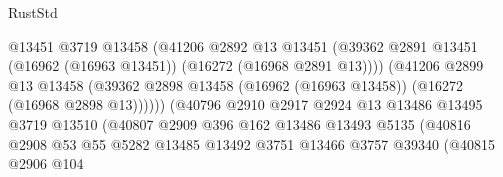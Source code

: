 \begin{lexlean}{RustStd}
\begin{coremodule}
                                          @13451
                                          @3719
                                          @13458
                                          (@41206
                                            @2892
                                            @13
                                            @13451
                                            (@39362
                                              @2891
                                              @13451
                                              (@16962 (@16963 @13451))
                                              (@16272 (@16968 @2891 @13))))
                                          (@41206
                                            @2899
                                            @13
                                            @13458
                                            (@39362
                                              @2898
                                              @13458
                                              (@16962 (@16963 @13458))
                                              (@16272 (@16968 @2898 @13))))))
                                      (@40796
                                        @2910
                                        @2917
                                        @2924
                                        @13
                                        @13486
                                        @13495
                                        @3719
                                        @13510
                                        (@40807
                                          @2909
                                          @396
                                          @162
                                          @13486
                                          @13493
                                          @5135
                                          (@40816
                                            @2908
                                            @53
                                            @55
                                            @5282
                                            @13485
                                            @13492
                                            @3751
                                            @13466
                                            @3757
                                            @39340
                                            (@40815
                                              @2906
                                              @104

\end{coremodule}
\end{lexlean}
